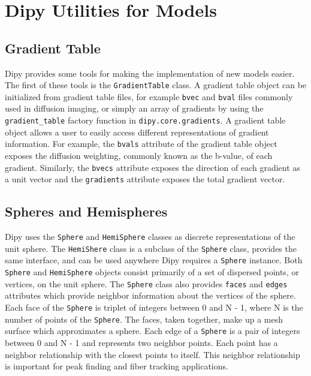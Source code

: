 \section{Dipy Utilities for Models}

\subsection{Gradient Table}
Dipy provides some tools for making the implementation of new models easier. The first of these tools is the \texttt{GradientTable} class. A gradient table object can be initialized from gradient table files, for example \texttt{bvec} and \texttt{bval} files commonly used in diffusion imaging, or simply an array of gradients by using the \texttt{gradient_table} factory function in \texttt{dipy.core.gradients}. A gradient table object allows a user to easily access different representations of gradient information. For example, the \texttt{bvals} attribute of the gradient table object exposes the diffusion weighting, commonly known as the b-value, of each gradient. Similarly, the \texttt{bvecs} attribute exposes the direction of each gradient as a unit vector and the \texttt{gradients} attribute exposes the total gradient vector.

\subsection{Spheres and Hemispheres}
Dipy uses the \texttt{Sphere} and \texttt{HemiSphere} classes as discrete representations of the unit sphere. The \texttt{HemiShere} class is a subclass of the \texttt{Sphere} class, provides the same interface, and can be used anywhere Dipy requires a \texttt{Sphere} instance.  Both \texttt{Sphere} and \texttt{HemiSphere} objects consist primarily of a set of dispersed points, or vertices, on the unit sphere. The \texttt{Sphere} class also provides \texttt{faces} and \texttt{edges} attributes which provide neighbor information about the vertices of the sphere. Each face of the \texttt{Sphere} is triplet of integers between 0 and N - 1, where N is the number of points of the \texttt{Sphere}. The faces, taken together, make up a mesh surface which approximates a sphere. Each edge of a \texttt{Sphere} is a pair of integers between 0 and N - 1 and represents two neighbor points. Each point has a neighbor relationship with the closest points to itself. This neighbor relationship is important for peak finding and fiber tracking applications.

